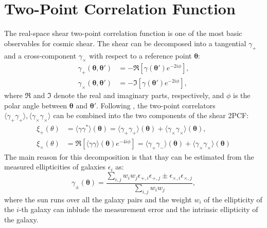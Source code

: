 \section{Two-Point Correlation Function}
The real-space shear two-point correlation function is one of the most basic observables for cosmic shear. The shear can be decomposed into a tangential $\gamma_+$ and a cross-component $\gamma_\times$ with respect to a reference point $\boldsymbol{\theta}$:
\begin{equation}
    \begin{split}
        \gamma_+(\boldsymbol{\theta}, \boldsymbol{\theta}') &= -\Re[\gamma(\boldsymbol{\theta}') e^{-2i\phi}], \\
        \gamma_\times(\boldsymbol{\theta}, \boldsymbol{\theta}') &= -\Im[\gamma(\boldsymbol{\theta}') e^{-2i\phi}],
    \end{split}
    \label{eq:shear_decomposition}
\end{equation}
where $\Re$ and $\Im$ denote the real and imaginary parts, respectively, and $\phi$ is the polar angle between $\boldsymbol{\theta}$ and $\boldsymbol{\theta}'$.
Following \citet{2015RPPh...78h6901K}, the two-point correlators $\langle \gamma_+ \gamma_+\rangle, \langle \gamma_\times \gamma_\times \rangle$ can be combined into the two components of the shear 2PCF:
\begin{equation}
    \begin{split}
        \xi_+(\theta) &= \langle \gamma \gamma^* \rangle (\boldsymbol{\theta}) = \langle \gamma_+ \gamma_+ \rangle (\boldsymbol{\theta}) + \langle \gamma_\times \gamma_\times \rangle (\boldsymbol{\theta}), \\
        \xi_\times(\theta) &= \Re \left[ \langle \gamma \gamma \rangle (\boldsymbol{\theta}) e^{-4i\phi} \right] = \langle \gamma_+ \gamma_- \rangle (\boldsymbol{\theta}) + \langle \gamma_\times \gamma_\times \rangle (\boldsymbol{\theta})
    \end{split}
    \label{eq:shear_2PCF}
\end{equation}
The main reason for this decomposition is that thay can be estimated from the measured ellipticities of galaxies $\epsilon_i$ as:
\begin{equation}
    \gamma_\pm (\boldsymbol{\theta}) = \frac{\sum_{i, j} w_i w_j \epsilon_{+, i}\epsilon_{+, j} \pm \epsilon_{\times, i}\epsilon_{\times, j}}{\sum_{i, j} w_i w_j},
    \label{eq:shear_estimator}
\end{equation}
where the sun runs over all the galaxy pairs and the weight $w_i$ of the ellipticity of the $i$-th galaxy can inblude the measurement error and the intrinsic ellipticity of the galaxy.
